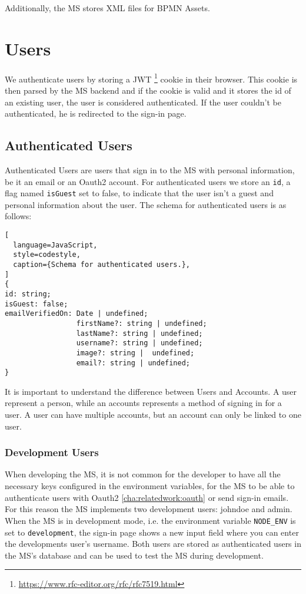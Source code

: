 Additionally, the MS stores XML files for BPMN Assets.

\section{Users}

We authenticate users by storing a JWT
\footnote{\url{https://www.rfc-editor.org/rfc/rfc7519.html}} cookie in their browser.
This cookie is then parsed by the MS backend and if the cookie is valid and it stores the
id of an existing user, the user is considered authenticated.
If the user couldn't be authenticated, he is redirected to the sign-in page.

\subsection{Authenticated Users}

Authenticated Users are users that sign in to the MS with personal information, be
it an email or an Oauth2 account.
For authenticated users we store an \lstinline{id}, a flag named \lstinline{isGuest} set
to false, to indicate that the user isn't a guest and personal information about the user.
The schema for authenticated users is as follows:

\begin{lstlisting}[
  language=JavaScript,
  style=codestyle,
  caption={Schema for authenticated users.},
]
{
id: string;
isGuest: false;
emailVerifiedOn: Date | undefined;
                 firstName?: string | undefined;
                 lastName?: string | undefined;
                 username?: string | undefined;
                 image?: string |  undefined;
                 email?: string | undefined;
}
\end{lstlisting}

It is important to understand the difference between Users and Accounts.
A user represent a person, while an accounts represents a method of signing in for a user.
A user can have multiple accounts, but an account can only be linked to one user.


\subsubsection{Development Users}

When developing the MS, it is not common for the developer to have all the necessary keys
configured in the environment variables, for the MS to be able to authenticate users with
Oauth2 \ref{cha:relatedwork:oauth} or send sign-in emails.
For this reason the MS implements two development users: johndoe and admin.
When the MS is in development mode, i.e. the environment variable \lstinline{NODE_ENV} is
set to \lstinline{development},
the sign-in page shows a new input field where you can enter the developments user's username.
Both users are stored as authenticated users in the MS's database and can be used to test
the MS during development.


